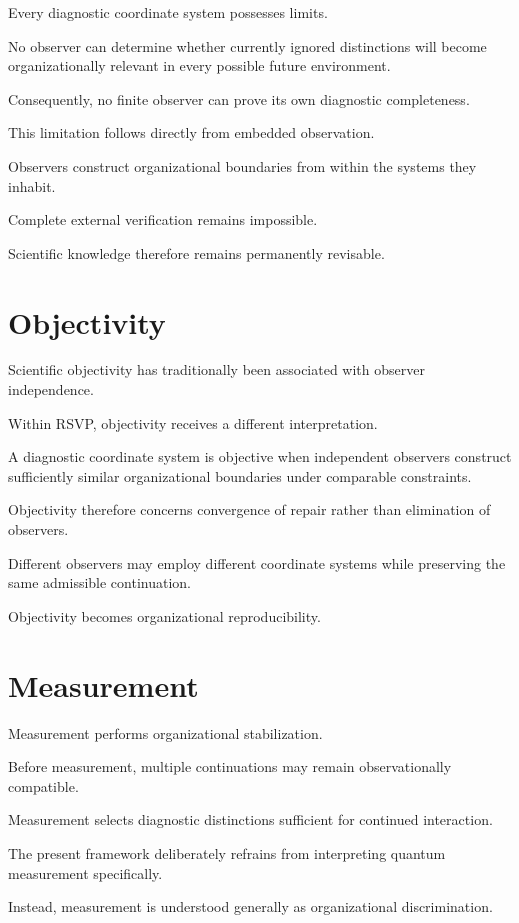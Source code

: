 \documentclass[11pt,oneside]{book}
\numberwithin{equation}{chapter}
\theoremstyle{definition}
\theoremstyle{plain}
\begin{document}
Every diagnostic coordinate system possesses limits.

No observer can determine whether currently ignored distinctions will
become organizationally relevant in every possible future environment.

Consequently, no finite observer can prove its own diagnostic completeness.

This limitation follows directly from embedded observation.

Observers construct organizational boundaries from within the systems they
inhabit.

Complete external verification remains impossible.

Scientific knowledge therefore remains permanently revisable.

\section{Objectivity}

Scientific objectivity has traditionally been associated with observer
independence.

Within RSVP, objectivity receives a different interpretation.

A diagnostic coordinate system is objective when independent observers
construct sufficiently similar organizational boundaries under comparable
constraints.

Objectivity therefore concerns convergence of repair rather than
elimination of observers.

Different observers may employ different coordinate systems while
preserving the same admissible continuation.

Objectivity becomes organizational reproducibility.

\section{Measurement}

Measurement performs organizational stabilization.

Before measurement, multiple continuations may remain observationally
compatible.

Measurement selects diagnostic distinctions sufficient for continued
interaction.

The present framework deliberately refrains from interpreting quantum
measurement specifically.

Instead, measurement is understood generally as organizational
discrimination.
\end{document}
